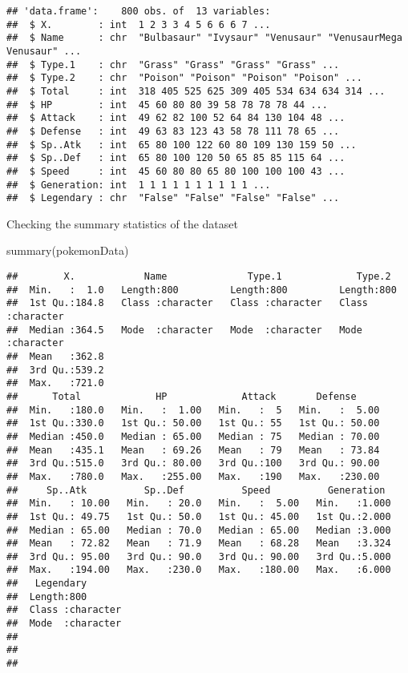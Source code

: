 \documentclass[
]{article}
\newenvironment{Shaded}{\begin{snugshade}}{\end{snugshade}}
\newcommand{\FunctionTok}[1]{\textcolor[rgb]{0.00,0.00,0.00}{#1}}
\newcommand{\NormalTok}[1]{#1}
\begin{document}
\begin{verbatim}
## 'data.frame':    800 obs. of  13 variables:
##  $ X.        : int  1 2 3 3 4 5 6 6 6 7 ...
##  $ Name      : chr  "Bulbasaur" "Ivysaur" "Venusaur" "VenusaurMega Venusaur" ...
##  $ Type.1    : chr  "Grass" "Grass" "Grass" "Grass" ...
##  $ Type.2    : chr  "Poison" "Poison" "Poison" "Poison" ...
##  $ Total     : int  318 405 525 625 309 405 534 634 634 314 ...
##  $ HP        : int  45 60 80 80 39 58 78 78 78 44 ...
##  $ Attack    : int  49 62 82 100 52 64 84 130 104 48 ...
##  $ Defense   : int  49 63 83 123 43 58 78 111 78 65 ...
##  $ Sp..Atk   : int  65 80 100 122 60 80 109 130 159 50 ...
##  $ Sp..Def   : int  65 80 100 120 50 65 85 85 115 64 ...
##  $ Speed     : int  45 60 80 80 65 80 100 100 100 43 ...
##  $ Generation: int  1 1 1 1 1 1 1 1 1 1 ...
##  $ Legendary : chr  "False" "False" "False" "False" ...
\end{verbatim}

Checking the summary statistics of the dataset

\begin{Shaded}
\begin{Highlighting}[]
\FunctionTok{summary}\NormalTok{(pokemonData)}
\end{Highlighting}
\end{Shaded}

\begin{verbatim}
##        X.            Name              Type.1             Type.2         
##  Min.   :  1.0   Length:800         Length:800         Length:800        
##  1st Qu.:184.8   Class :character   Class :character   Class :character  
##  Median :364.5   Mode  :character   Mode  :character   Mode  :character  
##  Mean   :362.8                                                           
##  3rd Qu.:539.2                                                           
##  Max.   :721.0                                                           
##      Total             HP             Attack       Defense      
##  Min.   :180.0   Min.   :  1.00   Min.   :  5   Min.   :  5.00  
##  1st Qu.:330.0   1st Qu.: 50.00   1st Qu.: 55   1st Qu.: 50.00  
##  Median :450.0   Median : 65.00   Median : 75   Median : 70.00  
##  Mean   :435.1   Mean   : 69.26   Mean   : 79   Mean   : 73.84  
##  3rd Qu.:515.0   3rd Qu.: 80.00   3rd Qu.:100   3rd Qu.: 90.00  
##  Max.   :780.0   Max.   :255.00   Max.   :190   Max.   :230.00  
##     Sp..Atk          Sp..Def          Speed          Generation   
##  Min.   : 10.00   Min.   : 20.0   Min.   :  5.00   Min.   :1.000  
##  1st Qu.: 49.75   1st Qu.: 50.0   1st Qu.: 45.00   1st Qu.:2.000  
##  Median : 65.00   Median : 70.0   Median : 65.00   Median :3.000  
##  Mean   : 72.82   Mean   : 71.9   Mean   : 68.28   Mean   :3.324  
##  3rd Qu.: 95.00   3rd Qu.: 90.0   3rd Qu.: 90.00   3rd Qu.:5.000  
##  Max.   :194.00   Max.   :230.0   Max.   :180.00   Max.   :6.000  
##   Legendary        
##  Length:800        
##  Class :character  
##  Mode  :character  
##                    
##                    
## 
\end{verbatim}
\end{document}
